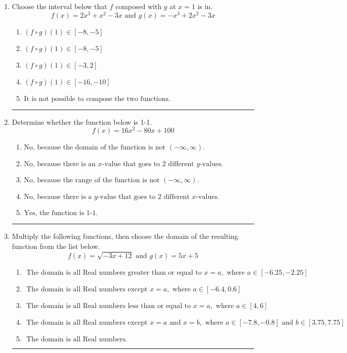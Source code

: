 \documentclass[14pt]{extbook}
\newcommand{\litem}[1]{\item#1\hspace*{-1cm}\rule{\textwidth}{0.4pt}}
\begin{document}
\begin{enumerate}
\litem{
Choose the interval below that $f$ composed with $g$ at $x=1$ is in.\[ f(x) = 2x^{3} + x^{2} -3 x \text{ and } g(x) = -x^{3} +2 x^{2} -3 x \]\begin{enumerate}[label=\Alph*.]
\item \( (f \circ g)(1) \in [-8, -5] \)
\item \( (f \circ g)(1) \in [-8, -5] \)
\item \( (f \circ g)(1) \in [-3, 2] \)
\item \( (f \circ g)(1) \in [-16, -10] \)
\item \( \text{It is not possible to compose the two functions.} \)

\end{enumerate} }
\litem{
Determine whether the function below is 1-1.\[ f(x) = 16 x^2 - 80 x + 100 \]\begin{enumerate}[label=\Alph*.]
\item \( \text{No, because the domain of the function is not $(-\infty, \infty)$.} \)
\item \( \text{No, because there is an $x$-value that goes to 2 different $y$-values.} \)
\item \( \text{No, because the range of the function is not $(-\infty, \infty)$.} \)
\item \( \text{No, because there is a $y$-value that goes to 2 different $x$-values.} \)
\item \( \text{Yes, the function is 1-1.} \)

\end{enumerate} }
\litem{
Multiply the following functions, then choose the domain of the resulting function from the list below.\[ f(x) = \sqrt{-3x+12}  \text{ and } g(x) = 5x + 5 \]\begin{enumerate}[label=\Alph*.]
\item \( \text{ The domain is all Real numbers greater than or equal to } x = a, \text{ where } a \in [-6.25, -2.25] \)
\item \( \text{ The domain is all Real numbers except } x = a, \text{ where } a \in [-6.4, 0.6] \)
\item \( \text{ The domain is all Real numbers less than or equal to } x = a, \text{ where } a \in [4, 6] \)
\item \( \text{ The domain is all Real numbers except } x = a \text{ and } x = b, \text{ where } a \in [-7.8, -0.8] \text{ and } b \in [3.75, 7.75] \)
\item \( \text{ The domain is all Real numbers. } \)


\end{enumerate}}
\end{enumerate}
\end{document}
